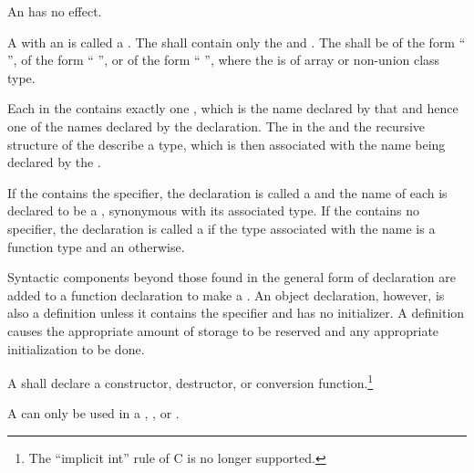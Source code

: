 \pnum
An  has no effect.

\pnum
A  with an  is called
a .
The  shall
contain only the  
and .
The  shall be
of the form ``\tcode{=} '',
of the form ``\tcode{\{}  \tcode{\}}'',
or
of the form ``\tcode{(}  \tcode{)}'',
where the
 is of array or non-union class type.

\pnum
Each  in the 
contains exactly one , which is the name
declared by that  and hence one of the names
declared by the declaration. The
 in the
 and the recursive 
structure of the  describe a
type, which is then associated with the name being
declared by the .

\pnum
If the  contains the 
specifier, the declaration is called a  and the name
of each 
is declared to be a , synonymous with its
associated type. If the
 contains no  specifier, the
declaration is called a  if
the type associated with the name is a function type and
an  otherwise.

\pnum
{}%
Syntactic components beyond those found in the general form of
declaration are added to a function declaration to make a
. An object declaration, however, is also
a definition unless it contains the  specifier and has no
initializer.
%
A
definition causes the appropriate amount of storage to be reserved and
any appropriate initialization to be done.

\pnum
A  shall declare a
constructor, destructor, or conversion function.\footnote{The
``implicit int'' rule of C is no longer supported.}
\begin{note}
A  can only be used in a
,
, or
.
\end{note}

